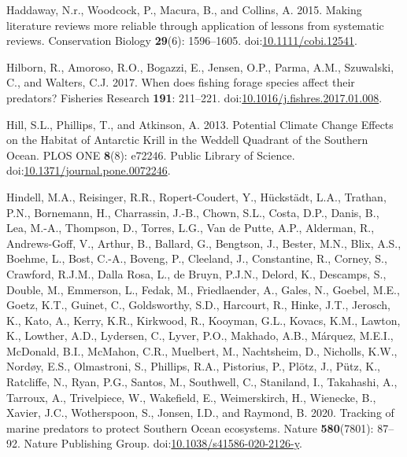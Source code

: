 \documentclass[
]{article}
\newlength{\cslhangindent}
\newenvironment{CSLReferences}[2] %
 {\begin{list}{}{%
  \setlength{\itemindent}{0pt}
  \setlength{\leftmargin}{0pt}
  \setlength{\parsep}{0pt}
  \ifodd #1
   \setlength{\leftmargin}{\cslhangindent}
   \setlength{\itemindent}{-1\cslhangindent}
  \fi
  \setlength{\itemsep}{#2\baselineskip}}}
 {\end{list}}
\begin{document}
\begin{CSLReferences}{1}{0}
Haddaway, N.r., Woodcock, P., Macura, B., and Collins, A. 2015. {Making
literature reviews more reliable through application of lessons from
systematic reviews}. Conservation Biology \textbf{29}(6): 1596--1605.
doi:\href{https://doi.org/10.1111/cobi.12541}{10.1111/cobi.12541}.

Hilborn, R., Amoroso, R.O., Bogazzi, E., Jensen, O.P., Parma, A.M.,
Szuwalski, C., and Walters, C.J. 2017. When does fishing forage species
affect their predators? Fisheries Research \textbf{191}: 211--221.
doi:\href{https://doi.org/10.1016/j.fishres.2017.01.008}{10.1016/j.fishres.2017.01.008}.

Hill, S.L., Phillips, T., and Atkinson, A. 2013. Potential {Climate
Change Effects} on the {Habitat} of {Antarctic Krill} in the {Weddell
Quadrant} of the {Southern Ocean}. PLOS ONE \textbf{8}(8): e72246.
Public Library of Science.
doi:\href{https://doi.org/10.1371/journal.pone.0072246}{10.1371/journal.pone.0072246}.

Hindell, M.A., Reisinger, R.R., Ropert-Coudert, Y., Hückstädt, L.A.,
Trathan, P.N., Bornemann, H., Charrassin, J.-B., Chown, S.L., Costa,
D.P., Danis, B., Lea, M.-A., Thompson, D., Torres, L.G., Van de Putte,
A.P., Alderman, R., Andrews-Goff, V., Arthur, B., Ballard, G., Bengtson,
J., Bester, M.N., Blix, A.S., Boehme, L., Bost, C.-A., Boveng, P.,
Cleeland, J., Constantine, R., Corney, S., Crawford, R.J.M., Dalla Rosa,
L., de Bruyn, P.J.N., Delord, K., Descamps, S., Double, M., Emmerson,
L., Fedak, M., Friedlaender, A., Gales, N., Goebel, M.E., Goetz, K.T.,
Guinet, C., Goldsworthy, S.D., Harcourt, R., Hinke, J.T., Jerosch, K.,
Kato, A., Kerry, K.R., Kirkwood, R., Kooyman, G.L., Kovacs, K.M.,
Lawton, K., Lowther, A.D., Lydersen, C., Lyver, P.O., Makhado, A.B.,
Márquez, M.E.I., McDonald, B.I., McMahon, C.R., Muelbert, M.,
Nachtsheim, D., Nicholls, K.W., Nordøy, E.S., Olmastroni, S., Phillips,
R.A., Pistorius, P., Plötz, J., Pütz, K., Ratcliffe, N., Ryan, P.G.,
Santos, M., Southwell, C., Staniland, I., Takahashi, A., Tarroux, A.,
Trivelpiece, W., Wakefield, E., Weimerskirch, H., Wienecke, B., Xavier,
J.C., Wotherspoon, S., Jonsen, I.D., and Raymond, B. 2020. Tracking of
marine predators to protect {Southern Ocean} ecosystems. Nature
\textbf{580}(7801): 87--92. Nature Publishing Group.
doi:\href{https://doi.org/10.1038/s41586-020-2126-y}{10.1038/s41586-020-2126-y}.


\end{CSLReferences}
\end{document}
